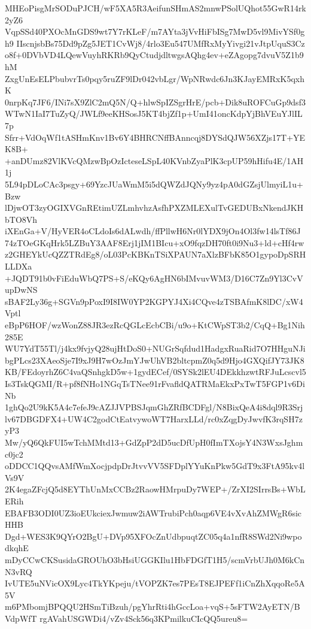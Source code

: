 MHEoPisgMrSODuPJCH/wF5XA5R3AeifunSHmAS2mnwPSolUQhot55GwR14rk2yZ6
VqpSSd40PXOcMnGDS9wt7Y7rKLeF/m7AYta3jVvHiFbISg7MwD5vl9MivYSf0gh9
IIscnjsbBs75Dd9pZg5JET1CvWj8/4rlo3Eu547UMfRxMyYivgi21vJtpUquS3Cz
o8f+0DVbVD4LQewVuyhRKRb9QyCtudjdltwgsAQhg4ev+eZAgopg7dvuV5Z1b9hM
ZxgUnEsELPbubvrTs0pqy5ruZF9lDr042vbLgr/WpNRwdc6Jn3KJayEMRxK5qxhK
0nrpKq7JF6/INi7sX9ZlC2mQ5N/Q+hlwSpIZSgrHrE/pcb+Dik8uROFCuGp9dsf3
WTwN1IaI7TuZyQ/JWLf9eeKHSosJ5KT4bjZf1p+UmI41oncKdpYjBhVEuYJlIL7p
Sfrr+VdOqWf1tASHmKnv1Bv6Y4BHRCNffBAnncqj8DYSdQJW56XZjs17T+YEK8B+
+anDUmz82VlKVcQMzwBpOzIcteseLSpL40KVnbZyaPlK3cpUP59hHifu4E/1AH1j
5L94pDLoCAc3psgy+69YzcJUaWmM5i5dQWZdJQNy9yz4pA0dGZsjUlmyiL1u+Bzw
lDjwOT3zyOGIXVGnREtimUZLmhvhzAsfhPXZMLEXulTvGEDUBxNkendJKHbTO8Vh
iXEnGa+V/HyVER4oCLdoIs6dALwdh/ffPllwH6Nr0lYDX9jOn4Ol3fw14lsTf86J
74zTOeGKqHrk5LZBuY3AAF8Erj1jIM1BIcu+xO9fqzDH70ft0i9Nu3+ld+cHf4rw
z2GHEYkUcQZZTRdEg8/oL03PcKBKnTSiXPAUN7aXlzBFbK85O1gypoDpSRHLLDXa
+JQDT91b0vFiEduWbQ7PS+S/eKQy6AgHN6bIMvuvWM3/D16C7Zn9Yl3CvVupDwNS
sBAF2Ly36g+SGVn9pPoxI9I8IW0YP2KGPYJ4Xi4CQve4zTSBAfmK8lDC/xW4Vptl
eBpP6HOF/wzWonZ88JR3ezRcQGLcEcbCBi/u9o+KtCWpST3b2/CqQ+Bg1Nih285E
WU7YdT55Tl/j4kx9fvjyQ28ujHtDoS0+NUGrSqfdud1HadgxRuaRid7O7HHguNJi
bgPLcs23XAeoSje7I9xJ9H7wOzJmYJwUhVB2bltcpmZ0q5d9Hjo4GXQifJY73JK8
KB/FEdoyrhZ6C4vaQSnhgkD5w+1gydECef/0SYSk2lEU4DEkkhzwtRFJuLcscvl5
Is3TskQGMI/R+pf8fNHo1NGqTsTNee91rFvafldQATRMaEkxPxTwT5FGP1v6DiNb
1ghQo2U9kK5A4c7efeJ9cAZJJVPBSJqmGhZRfBCDFgl/N8BixQeA4i8dql9R3Srj
lv67DBGDFX4+UW4C2godCtEatvywoWT7HarxLLd/rc0xZqgDyJwvfK3rqSH7zyP3
Mw/yQ6QkFUI5wTchMMtd13+GdZpP2dD5ucDfUpH0fImTXojsY4N3WxsJghmc0jc2
oDDCC1QQvsAMfWmXocjpdpDrJtvvVV5SFDplYYuKnPkw5GdT9x3FtA95kv4lVs9V
2K4egaZFcjQ5d8EYThUnMxCCBz2RaowHMrpuDy7WEP+/ZrXI2SIrrsBs+WbLERih
EBAFB3ODI0UZ3ioEUkciexJwmuw2iAWTrubiPch0aqp6VE4vXvAhZMWgR6sicHHB
Dgd+WES3K9QYrO2BgU+DVp95XFOcZnUdbpuqtZC05q4a1nfR8SWd2Ni9wpodkqhE
mDyCCwCKSusidaGROUhO3bHsiUGGKIlu1HbFDGfT1H5/scmVrbUJh0M6kCnN3vRQ
IvUTE5uNVicOX9Lyc4TkYKpeju/tVOPZK7es7PEsT8EJPEFf1iCnZhXqqoRe5A5V
m6PMbomjBPQQU2HSmTiBzuh/pgYhrRti4hGccLoa+vqS+5sFTW2AyETN/BVdpWfT
rgAVahUSGWDi4/vZv4Sck56q3KPmilkuCIcQQ5ureu8=
